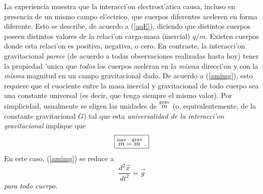 La experiencia muestra que la interacci'on electrost'atica causa, incluso en presencia de un mismo campo el'ectrico, que cuerpos diferentes aceleren en forma diferente. Esto se describe, de acuerdo a (\ref{aqE}), diciendo que distintos cuerpos poseen distintos valores de la relaci'on carga-masa (inercial) $q/m$. Existen cuerpos donde esta relaci'on es positiva, negativa, o cero. En contraste, la interacci'on gravitacional \textit{parece} (de acuerdo a todas observaciones realizadas hasta hoy) tener la propiedad 'unica que \textit{todos} los cuerpos aceleran en la \textit{misma} direcci'on y con la \textit{misma} magnitud en un campo gravitacional dado. De acuerdo a (\ref{amimg}), esto requiere que el cuociente entre la masa inercial y gravitacional de todo cuerpo sea una constante universal (es decir, que tenga siempre el mismo valor). Por simplicidad, usualmente se eligen las unidades de $\stackrel{\rm grav}{m}$ (o, equivalentemente, de la constante gravitacional $G$) tal que esta \textit{universalidad de la interacci'on gravitacional} implique que
\begin{equation}
\boxed{\stackrel{\rm iner}{m}=\stackrel{\rm grav}{m}.}
\end{equation}
En este caso, (\ref{amimg}) se reduce a
\begin{equation}\label{ag}
\frac{d^2\vec{x}}{dt^2}=\vec{g}
\end{equation}
\textit{para todo cuerpo}.

